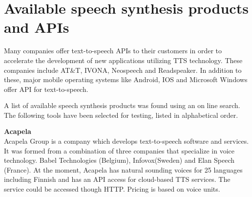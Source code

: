 \documentclass[11pt,a4paper,oneside,article]{memoir}
\begin{document}
\section{Available speech synthesis products and APIs}
Many companies offer text-to-speech APIs to their customers in order to accelerate the development of new applications utilizing TTS technology. These companies include AT\&T, IVONA, Neospeech and Readspeaker. In addition to these, major mobile operating systems like Android, IOS and Microsoft Windows offer API for text-to-speech. \cite{wiki:speech-synthesis}


%



A list of available speech synthesis products was found using an on line search. The following tools have been selected for testing, listed in alphabetical order. 

\textbf{Acapela}\\
Acapela Group is a company which develops text-to-speech software and services. It was formed from a combination of three companies that specialize in voice technology. Babel Technologies (Belgium), Infovox(Sweden) and Elan Speech (France). At the moment, Acapela has natural sounding voices for 25 languages including Finnish and has an API access for cloud-based TTS services. The service could be accessed though HTTP. Pricing is based on voice units. \cite{acapela}
\end{document}
